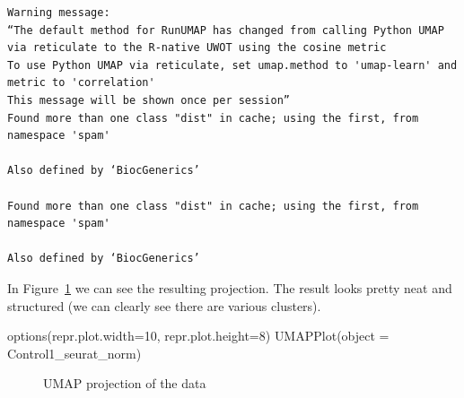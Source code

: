 \documentclass[
  letterpaper,
  DIV=11,
  numbers=noendperiod]{scrartcl}
\newenvironment{Shaded}{\begin{snugshade}}{\end{snugshade}}
\newcommand{\AttributeTok}[1]{\textcolor[rgb]{0.40,0.45,0.13}{#1}}
\newcommand{\DecValTok}[1]{\textcolor[rgb]{0.68,0.00,0.00}{#1}}
\newcommand{\FunctionTok}[1]{\textcolor[rgb]{0.28,0.35,0.67}{#1}}
\newcommand{\NormalTok}[1]{\textcolor[rgb]{0.00,0.23,0.31}{#1}}
\begin{document}
\begin{verbatim}
Warning message:
“The default method for RunUMAP has changed from calling Python UMAP via reticulate to the R-native UWOT using the cosine metric
To use Python UMAP via reticulate, set umap.method to 'umap-learn' and metric to 'correlation'
This message will be shown once per session”
Found more than one class "dist" in cache; using the first, from namespace 'spam'

Also defined by ‘BiocGenerics’

Found more than one class "dist" in cache; using the first, from namespace 'spam'

Also defined by ‘BiocGenerics’
\end{verbatim}

In Figure~\ref{fig-umap} we can see the resulting projection. The result
looks pretty neat and structured (we can clearly see there are various
clusters).

\begin{Shaded}
\begin{Highlighting}[]
\FunctionTok{options}\NormalTok{(}\AttributeTok{repr.plot.width=}\DecValTok{10}\NormalTok{, }\AttributeTok{repr.plot.height=}\DecValTok{8}\NormalTok{)}
\FunctionTok{UMAPPlot}\NormalTok{(}\AttributeTok{object =}\NormalTok{ Control1\_seurat\_norm)}
\end{Highlighting}
\end{Shaded}

\begin{figure}[H]


\caption{\label{fig-umap}UMAP projection of the data}

\end{figure}%
\end{document}
